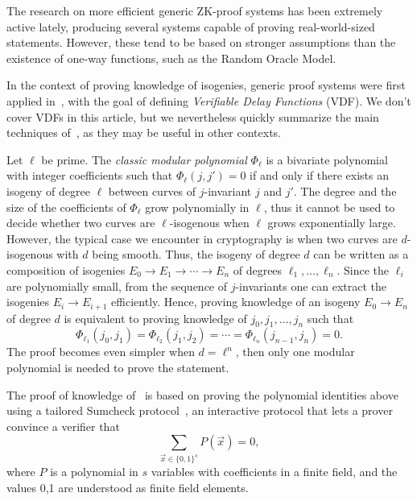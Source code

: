 \documentclass{llncs}
\begin{document}
The research on more efficient generic ZK-proof systems has been extremely active lately, producing several systems capable of proving real-world-sized statements.
However, these tend to be based on stronger assumptions than the existence of one-way functions, such as the Random Oracle Model. %

In the context of proving knowledge of isogenies, generic proof systems were first applied in~\cite{10.1007/978-3-030-99277-4_21}, with the goal of defining \emph{Verifiable Delay Functions} (VDF).
We don't cover VDFs in this article, but we nevertheless quickly summarize the main techniques of~\cite{10.1007/978-3-030-99277-4_21}, as they may be useful in other contexts.

Let $\ell$ be prime.
The \emph{classic modular polynomial} $\Phi_\ell$ is a bivariate polynomial with integer coefficients such that $\Phi_\ell(j, j') = 0$ if and only if there exists an isogeny of degree $\ell$ between curves of $j$-invariant $j$ and $j'$.
The degree and the size of the coefficients of $\Phi_\ell$ grow polynomially in $\ell$, thus it cannot be used to decide whether two curves are $\ell$-isogenous when $\ell$ grows exponentially large.
However, the typical case we encounter in cryptography is when two curves are $d$-isogenous with $d$ being smooth.
Thus, the isogeny of degree $d$ can be written as a composition of isogenies $E_0 \to E_1 \to \cdots \to E_n$ of degrees $\ell_1, \ldots, \ell_n$.
Since the $\ell_i$ are polynomially small, from the sequence of $j$-invariants one can extract the isogenies $E_i \to E_{i+1}$ efficiently. Hence, proving knowledge of an isogeny $E_0 \to E_n$ of degree $d$ is equivalent to proving knowledge of $j_0, j_1, \ldots, j_n$ such that
\begin{equation}
    \label{eq:modpol}
    \Phi_{\ell_1}(j_0, j_1) = \Phi_{\ell_2}(j_1, j_2) = \cdots = \Phi_{\ell_n}(j_{n-1},j_n) = 0.
\end{equation}
The proof becomes even simpler when $d = \ell^n$, then only one modular polynomial is needed to prove the statement.

The proof of knowledge of~\cite{10.1007/978-3-030-99277-4_21} is based on proving the  polynomial identities above using a tailored Sumcheck protocol~\cite{10.1145/146585.146605}, an interactive protocol that lets a prover convince a verifier that
\begin{equation}
    \sum_{\vec{x}\in\{0,1\}^s} P(\vec{x}) = 0,
\end{equation}
where $P$ is a polynomial in $s$ variables with coefficients in a finite field, and the values 0,1 are understood as finite field elements.
\end{document}
